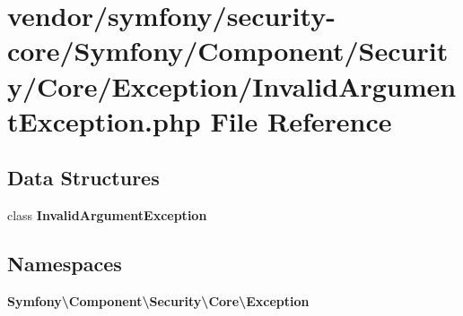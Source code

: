 \section{vendor/symfony/security-\/core/\+Symfony/\+Component/\+Security/\+Core/\+Exception/\+Invalid\+Argument\+Exception.php File Reference}
\label{symfony_2security-core_2_symfony_2_component_2_security_2_core_2_exception_2_invalid_argument_exception_8php}
\subsection*{Data Structures}
\begin{DoxyCompactItemize}
\item 
class {\bf Invalid\+Argument\+Exception}
\end{DoxyCompactItemize}
\subsection*{Namespaces}
\begin{DoxyCompactItemize}
\item 
 {\bf Symfony\textbackslash{}\+Component\textbackslash{}\+Security\textbackslash{}\+Core\textbackslash{}\+Exception}
\end{DoxyCompactItemize}
